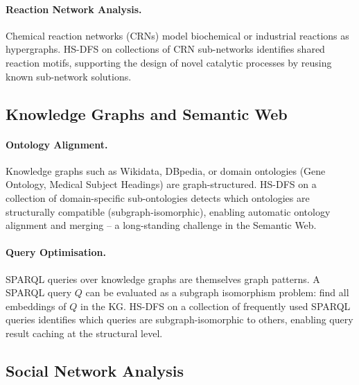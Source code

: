 ﻿\documentclass[12pt,a4paper]{article}
\theoremstyle{plain}
\theoremstyle{definition}
\theoremstyle{remark}
\begin{document}
	\paragraph{Reaction Network Analysis.}
	Chemical reaction networks (CRNs) model biochemical or industrial reactions
	as hypergraphs.  HS-DFS on collections of CRN sub-networks identifies shared
	reaction motifs, supporting the design of novel catalytic processes by
	reusing known sub-network solutions.
	
	\subsection{Knowledge Graphs and Semantic Web}
	\label{sec:kg}
	
	\paragraph{Ontology Alignment.}
	Knowledge graphs such as Wikidata, DBpedia, or domain ontologies (Gene
	Ontology, Medical Subject Headings) are graph-structured.  HS-DFS on a
	collection of domain-specific sub-ontologies detects which ontologies are
	structurally compatible (subgraph-isomorphic), enabling automatic ontology
	alignment and merging -- a long-standing challenge in the Semantic Web.
	
	\paragraph{Query Optimisation.}
	SPARQL queries over knowledge graphs are themselves graph patterns.  A
	SPARQL query $Q$ can be evaluated as a subgraph isomorphism problem:
	find all embeddings of $Q$ in the KG.  HS-DFS on a collection of frequently
	used SPARQL queries identifies which queries are subgraph-isomorphic to
	others, enabling query result caching at the structural level.
	
	\subsection{Social Network Analysis}
	\label{sec:social}
	
\end{document}
